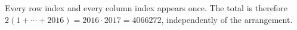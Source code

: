 Every row index and every column index appears once. The total is therefore $ 2(1+\cdots+2016)=2016\cdot2017=\boxed{4066272}$, independently of the arrangement.
